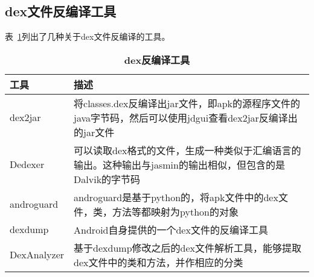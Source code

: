 \subsection{dex文件反编译工具}
\label{dextools}
表~\ref{tab:dextools}列出了几种关于dex文件反编译的工具。
\begin{table}[htbp]
\caption{\label{tab:dextools}\textbf{dex反编译工具}}
\begin{tabular}{|p{2cm}|p{9.5cm}|}
\hline
工具 & 描述\\
\hline
dex2jar & 将classes.dex反编译出jar文件，即apk的源程序文件的java字节码，然后可以使用jdgui查看dex2jar反编译出的jar文件\\
\hline
Dedexer & 可以读取dex格式的文件，生成一种类似于汇编语言的输出。这种输出与jasmin的输出相似，但包含的是Dalvik的字节码\\
\hline
androguard & androguard是基于python的，将apk文件中的dex文件，类，方法等都映射为python的对象\\\hline
dexdump & Android自身提供的一个dex文件的反编译工具\\
\hline
DexAnalyzer & 基于dexdump修改之后的dex文件解析工具，能够提取dex文件中的类和方法，并作相应的分类\\
\hline
\end{tabular}
\end{table}

